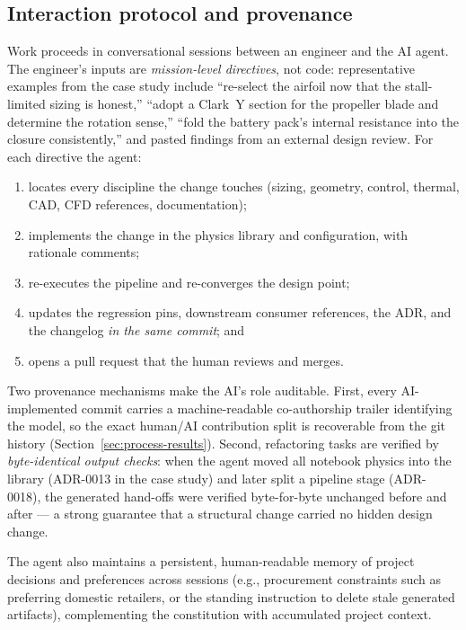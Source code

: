 \subsection{Interaction protocol and provenance}
\label{sec:protocol}

Work proceeds in conversational sessions between an engineer and the
AI agent. The engineer's inputs are \emph{mission-level directives},
not code: representative examples from the case study include
``re-select the airfoil now that the stall-limited sizing is
honest,'' ``adopt a Clark~Y section for the propeller blade and
determine the rotation sense,'' ``fold the battery pack's internal
resistance into the closure consistently,'' and pasted findings from
an external design review. For each directive the agent:

\begin{enumerate}[nosep]
\item locates every discipline the change touches (sizing, geometry,
  control, thermal, CAD, CFD references, documentation);
\item implements the change in the physics library and configuration,
  with rationale comments;
\item re-executes the pipeline and re-converges the design point;
\item updates the regression pins, downstream consumer references, the
  ADR, and the changelog \emph{in the same commit}; and
\item opens a pull request that the human reviews and merges.
\end{enumerate}

Two provenance mechanisms make the AI's role auditable. First, every
AI-implemented commit carries a machine-readable co-authorship trailer
identifying the model, so the exact human/AI contribution split is
recoverable from the git history (Section~\ref{sec:process-results}).
Second, refactoring tasks are verified by \emph{byte-identical output
checks}: when the agent moved all notebook physics into the library
(ADR-0013 in the case study) and later split a pipeline stage
(ADR-0018), the generated hand-offs were verified byte-for-byte
unchanged before and after --- a strong guarantee that a structural
change carried no hidden design change.

The agent also maintains a persistent, human-readable memory of
project decisions and preferences across sessions (e.g., procurement
constraints such as preferring domestic retailers, or the standing
instruction to delete stale generated artifacts), complementing the
constitution with accumulated project context.

